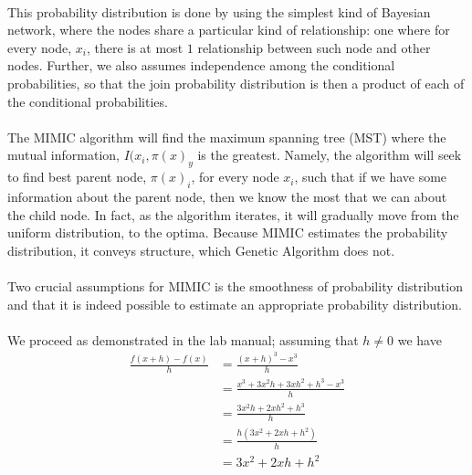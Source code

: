 \documentclass{article}
\begin{document}
\paragraph{}
This probability distribution is done by using the simplest kind of Bayesian network, where the nodes share a particular kind of relationship: one where for every node, $x_i$, there is at most $1$ relationship between such node and other nodes. Further, we also assumes independence among the conditional probabilities, so that the join probability distribution is then a product of each of the conditional probabilities. 

\paragraph{}
The MIMIC algorithm will find the maximum spanning tree (MST) where the mutual information, $I(x_i, \pi(x)_y$ is the greatest. Namely, the algorithm will seek to find best parent node, $\pi(x)_i$, for every node $x_i$, such that if we have some information about the parent node, then we know the most that we can about the child node. In fact, as the algorithm iterates, it will gradually move from the uniform distribution, to the optima. Because MIMIC estimates the probability distribution, it conveys structure, which Genetic Algorithm does not.

\paragraph{}
Two crucial assumptions for MIMIC is the smoothness of probability distribution and that it is indeed possible to estimate an appropriate probability distribution.

\paragraph{}
We proceed as demonstrated in the lab manual; assuming that $h\ne 0$ 
we have
\begin{align*}
    \frac{f(x+h)-f(x)}{h} & =  \frac{(x+h)^3-x^3}{h}   \\
                          & =  \frac{x^3+3x^2h+3xh^2+h^3 - x^3}{h}\\
                          & =  \frac{3x^2h+2xh^2+h^3}{h}\\
                          & =  \frac{h(3x^2+2xh+h^2)}{h}\\
                          & =  3x^2+2xh+h^2
\end{align*} 
\end{document}
